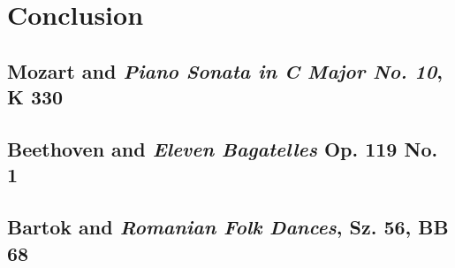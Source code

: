 \chapter*{Conclusion}\label{conclusion}

\section*{Mozart and \textit{Piano Sonata in C Major No. 10}, K 330}

\section*{Beethoven and \textit{Eleven Bagatelles} Op. 119 No. 1}

\section*{Bartok and \textit{Romanian Folk Dances}, Sz. 56, BB 68}





